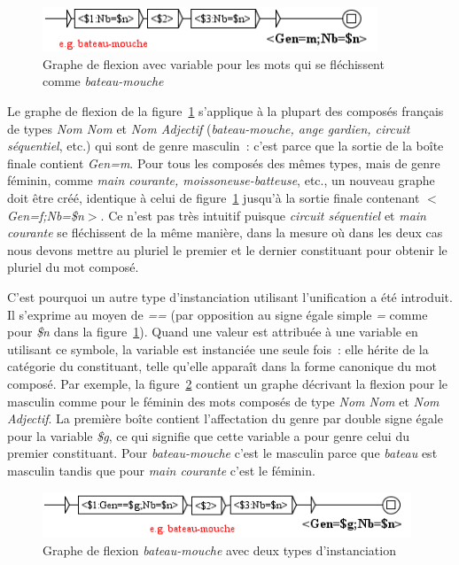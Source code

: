 \begin{figure}[!htb]
  \centering
  \includegraphics[width=10cm]{resources/img/BateauMouche2.png}
  \caption{Graphe de flexion avec variable pour les mots qui se fléchissent comme
  \emph{bateau-mouche}}
  \label{fig:BateauMouche2}
\end{figure}

\bigskip
\noindent Le graphe de flexion de la figure~\ref{fig:BateauMouche2} s'applique à la plupart des
composés français de types \emph{Nom Nom} et \emph{Nom Adjectif} (\emph{bateau-mouche, ange
gardien, circuit séquentiel}, etc.) qui sont de genre masculin~: c'est parce que la sortie de la 
boîte finale contient \emph{Gen=m}. Pour tous les composés des mêmes types, mais de genre féminin,
comme \emph{main courante, moissoneuse-batteuse}, etc., un nouveau graphe doit être créé, identique
à celui de figure~\ref{fig:BateauMouche2} jusqu'à la sortie finale contenant
\emph{$<$Gen=f;Nb=\$n$>$}.
Ce n'est pas très intuitif puisque \emph{circuit séquentiel} et \emph{main courante} se fléchissent
de la même manière, dans la mesure où dans les deux cas nous devons mettre au pluriel le premier et
le dernier constituant pour obtenir le pluriel du mot composé.

\bigskip
\noindent C'est pourquoi un autre type d'instanciation utilisant l'unification a été introduit. 
Il s'exprime au moyen de \emph{==} (par opposition au signe égale simple \emph{=} comme pour
\emph{\$n} dans la figure~\ref{fig:BateauMouche2}).
Quand une valeur est attribuée à une variable en utilisant ce symbole, la variable est instanciée une seule fois~:
elle hérite de la catégorie du
constituant, telle qu'elle apparaît dans la forme canonique du mot composé. Par exemple, la
figure~\ref{fig:BateauMouche3} contient un graphe décrivant la flexion pour le masculin comme pour
le féminin des mots composés de type \emph{Nom Nom} et \emph{Nom Adjectif}. La première boîte
contient l'affectation du genre par double signe égale pour la variable \emph{\$g}, ce qui signifie que cette
variable a pour genre celui du premier constituant. Pour \emph{bateau-mouche} c'est le masculin
parce que \emph{bateau} est masculin tandis que pour \emph{main courante} c'est le féminin. 

\begin{figure}[!htb]
  \centering
  \includegraphics[width=11cm]{resources/img/BateauMouche3.png}
  \caption{Graphe de flexion \emph{bateau-mouche} avec deux types d'instanciation}
  \label{fig:BateauMouche3}
\end{figure}

